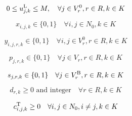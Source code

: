 \begin{linenomath}
    \begin{equation}
        0 \leq u_{j,k}^{\text{L}} \leq M, \quad \forall j \in V^0_r, r \in R, k \in K \label{eq:laborer_aux_bounds}
    \end{equation}
\end{linenomath}

\begin{linenomath}
    \begin{equation}
        x_{i,j,k} \in \{0,1\} \quad \forall i,j \in N_0, k \in K \label{eq:binary_vars_truck}
    \end{equation}
\end{linenomath}

\begin{linenomath}
    \begin{equation}
        y_{i,j,r,k} \in \{0,1\} \quad \forall i,j \in V^0_r, r \in R, k \in K \label{eq:binary_vars_laborer}
    \end{equation}
\end{linenomath}

\begin{linenomath}
    \begin{equation}
        p_{j,r,k} \in \{0,1\} \quad \forall j \in V_r, r \in R, k \in K \label{eq:binary_vars_pickup}
    \end{equation}
\end{linenomath}

\begin{linenomath}
    \begin{equation}
        s_{j,r,k} \in \{0,1\} \quad \forall j \in V_r^{\text{B}}, r \in R, k \in K \label{eq:binary_vars_repair}
    \end{equation}
\end{linenomath}

\begin{linenomath}
    \begin{equation}
        d_{r,k} \geq 0 \text{ and integer} \quad \forall r \in R, k \in K \label{eq:variable_domains_dropoff}
    \end{equation}
\end{linenomath}

\begin{linenomath}
    \begin{equation}
        c_{i,j,k}^{\text{T}} \geq 0 \quad \forall i,j \in N_0, i \neq j, k \in K \label{eq:variable_domains_truck}
    \end{equation}
\end{linenomath}

